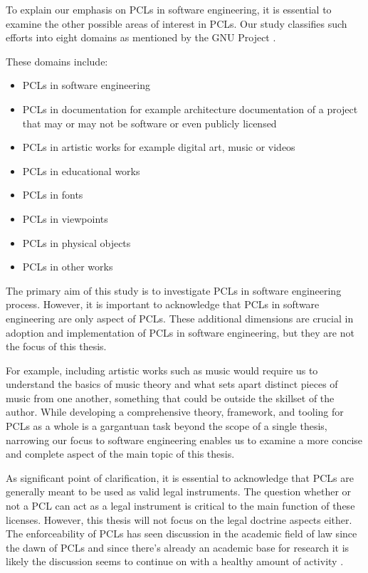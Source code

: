 To explain our emphasis on PCLs in software engineering, it is essential to examine the other possible areas of interest in PCLs. Our study classifies such efforts into eight domains as mentioned by the GNU Project \citep{gnu:licenselist}.

These domains include:
\begin{itemize}
	\item PCLs in software engineering
	\item PCLs in documentation for example architecture documentation of a project that may or may not be software or even publicly licensed
	\item PCLs in artistic works for example digital art, music or videos
	\item PCLs in educational works
	\item PCLs in fonts
	\item PCLs in viewpoints
	\item PCLs in physical objects
	\item PCLs in other works
\end{itemize}

The primary aim of this study is to investigate PCLs in software engineering process. However, it is important to acknowledge that PCLs in software engineering are only aspect of PCLs. These additional dimensions are crucial in adoption and implementation of PCLs in software engineering, but they are not the focus of this thesis.

For example, including artistic works such as music would require us to understand the basics of music theory and what sets apart distinct pieces of music from one another, something that could be outside the skillset of the author. While developing a comprehensive theory, framework, and tooling for PCLs as a whole is a gargantuan task beyond the scope of a single thesis, narrowing our focus to software engineering enables us to examine a more concise and complete aspect of the main topic of this thesis. 

As significant point of clarification, it is essential to acknowledge that PCLs are generally meant to be used as valid legal instruments. The question whether or not a PCL can act as a legal instrument is critical to the main function of these licenses. However, this thesis will not focus on the legal doctrine aspects either. The enforceability of PCLs has seen discussion in the academic field of law since the dawn of PCLs and since there's already an academic base for research it is likely the discussion seems to continue on with a healthy amount of activity \citep{duisburg2011gpl}.

